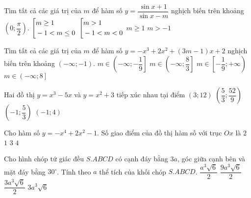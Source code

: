 \begin{ex}%
Tìm tất cả các giá trị của $m$ để hàm số $y=\dfrac{\sin x+1}{\sin x-m}$ nghịch biến trên khoảng $\left(0;\dfrac{\pi}{2}\right)$.
\choice
{\True $\left[\begin{aligned}&m\geq 1\\ &-1<m\leq 0\end{aligned}\right.$}
{$\left[\begin{aligned}&m> 1\\ &-1<m< 0\end{aligned}\right.$}
{$m\geq 1$}
{$m>-1$}
\end{ex}
\begin{ex}%
Tìm tất cả các giá trị của $m$ để hàm số $y=-x^{3}+2x^{2}+(3m-1)x+2$ nghịch biến trên khoảng $(-\infty;-1)$.
\choice
{$m\in\left(-\infty;-\dfrac{1}{9}\right]$}
{\True $m\in\left(-\infty;\dfrac{8}{3}\right]$}
{$m\in\left[-\dfrac{1}{9};+\infty\right)$}
{$m\in\left(-\infty;8\right]$}
\end{ex}
\begin{ex}%
Hai đồ thị $y=x^{3}-5x$ và $y=x^{2}+3$ tiếp xúc nhau tại điểm
\choice
{$(3;12)$}
{$\left(\dfrac{5}{3};\dfrac{52}{9}\right)$}
{$\left(-1;\dfrac{5}{3}\right)$}
{\True $(-1;4)$}
\end{ex}
\begin{ex}%
Cho hàm số $y=-x^{4}+2x^{2}-1$. Số giao điểm của đồ thị hàm số với trục $Ox$ là
\choice
{\True $2$}
{$1$}
{$3$}
{$4$}
\end{ex}
\begin{ex}%
Cho hình chóp tứ giác đều $S.ABCD$ có cạnh đáy bằng $3a$, góc giữa cạnh bên và mặt đáy bằng $30^{\circ}$. Tính theo $a$ thể tích của khối chóp $S.ABCD$.
\choice
{$\dfrac{a^{3}\sqrt{6}}{2}$}
{$\dfrac{9a^{3}\sqrt{6}}{2}$}
{$\dfrac{3a^{3}\sqrt{6}}{2}$}
{\True $3a^{3}\sqrt{6}$}
\end{ex}
